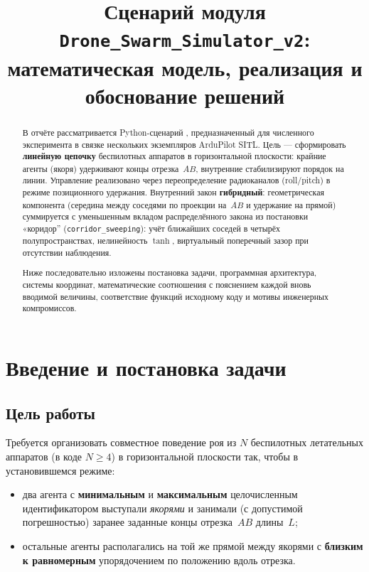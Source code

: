 \documentclass[a4paper,11pt]{article}
\title{Сценарий \code{linear_chain2.py} модуля\\ \texttt{Drone\_Swarm\_Simulator\_v2}:\\
математическая модель, реализация и обоснование решений}
\author{}
\date{}
\newcommand{\code}[1]{\texttt{\detokenize{#1}}}
\begin{document}
\maketitle

\begin{abstract}
В отчёте рассматривается Python-сценарий \code{scenarios/linear_chain2.py}, предназначенный для численного эксперимента в связке нескольких экземпляров ArduPilot SITL. Цель --- сформировать \textbf{линейную цепочку} беспилотных аппаратов в горизонтальной плоскости: крайние агенты (якоря) удерживают концы отрезка~$AB$, внутренние стабилизируют порядок на линии. Управление реализовано через переопределение радиоканалов (roll/pitch) в режиме позиционного удержания. Внутренний закон \textbf{гибридный}: геометрическая компонента (середина между соседями по проекции на~$AB$ и удержание на прямой) суммируется с уменьшенным вкладом распределённого закона из постановки «коридор'' (\texttt{corridor\_sweeping}): учёт ближайших соседей в четырёх полупространствах, нелинейность $\tanh$, виртуальный поперечный зазор при отсутствии наблюдения.

Ниже последовательно изложены постановка задачи, программная архитектура, системы координат, математические соотношения с пояснением каждой вновь вводимой величины, соответствие функций исходному коду и мотивы инженерных компромиссов.
\end{abstract}

\tableofcontents
\newpage

\section{Введение и постановка задачи}

\subsection{Цель работы}
Требуется организовать совместное поведение роя из $N$ беспилотных летательных аппаратов (в коде $N\ge 4$) в горизонтальной плоскости так, чтобы в установившемся режиме:
\begin{itemize}
  \item два агента с \textbf{минимальным} и \textbf{максимальным} целочисленным идентификатором \code{id} выступали \emph{якорями} и занимали (с допустимой погрешностью) заранее заданные концы отрезка~$AB$ длины~$L$;
  \item остальные агенты располагались на той же прямой между якорями с \textbf{близким к равномерным} упорядочением по положению вдоль отрезка.
\end{itemize}
\end{document}
